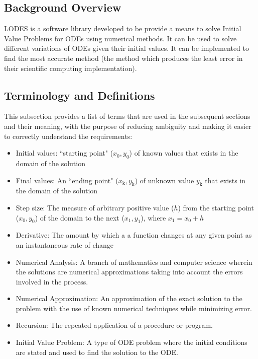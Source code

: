 \documentclass[12pt]{article}
\newcommand{\famname}{LODES} %
\begin{document}
\subsection{Background Overview} \label{Sec_Background}
\famname{} is a software library developed to be provide a means to solve Initial Value
Problems for ODEs using numerical methods. It can be used to solve different variations of ODEs
given their initial values. It can be implemented to find the most accurate method (the method
which produces the least error in their scientific computing implementation).

\subsection{Terminology and  Definitions}

This subsection provides a list of terms that are used in the subsequent
sections and their meaning, with the purpose of reducing ambiguity and making it
easier to correctly understand the requirements:

\begin{itemize}

\item Initial values: ``starting point" ($x_\text{0}, y_\text{0}$) of known values that
exists in the domain of the solution

\item Final values: An ``ending point" ($x_\text{k}, y_\text{k}$) of unknown value $y_\text{k}$
that exists in the domain of the solution

\item Step size: The measure of arbitrary positive value ($h$) from the starting point
($x_\text{0}, y_\text{0}$) of the domain to the next ($x_\text{1}, y_\text{1}$), where
$x_\text{1} = x_\text{0} + h$

\item Derivative: The amount by which a a function changes at any given point as an
instantaneous rate of change

\item Numerical Analysis: A branch of mathematics and computer science wherein the solutions
are numerical approximations taking into account the errors involved in the process.

\item Numerical Approximation: An approximation of the exact solution to the problem with the
use of known numerical techniques while minimizing error.

\item Recursion: The repeated application of a procedure or program.

\item Initial Value Problem: A type of ODE problem where the initial conditions are stated and
used to find the solution to the ODE.

\end{itemize}
\end{document}
